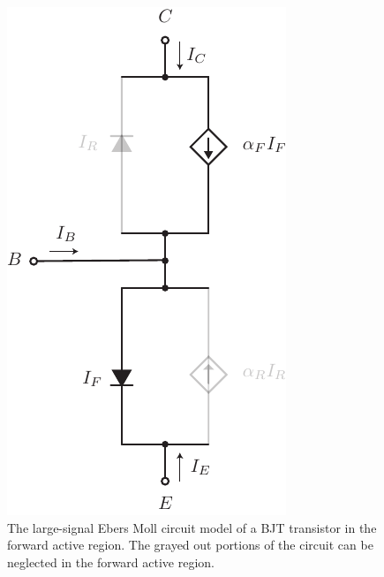 \begin{figure}[tb]
\centering
\includegraphics[scale=.7]{slide18_ebers_moll_approx}
\caption{The large-signal Ebers Moll circuit model of a BJT transistor in the forward active region.  The grayed out portions of the circuit can be neglected in the forward active region.} \label{fig:slide18_ebers_moll_approx}
\end{figure}
